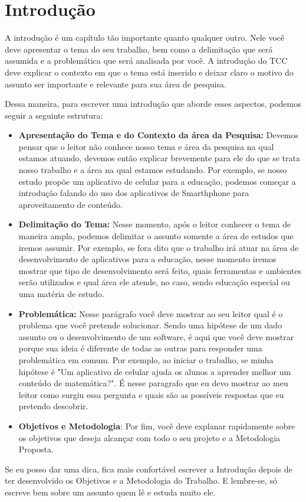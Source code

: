 \chapter{Introdução}

A introdução é um capítulo tão importante quanto qualquer outro. Nele você deve apresentar o tema do seu trabalho, bem como a delimitação que será assumida e a problemática que será analisada por você. A introdução do TCC deve explicar o contexto em que o tema está inserido e deixar claro o motivo do assunto ser importante e relevante para sua área de pesquisa.

Dessa maneira, para escrever uma introdução que aborde esses aspectos, podemos seguir a seguinte estrutura:

\begin{itemize}
    \item \textbf{Apresentação do Tema e do Contexto da área da Pesquisa:} Devemos pensar que o leitor não conhece nosso tema e área da pesquisa na qual estamos atuando, devemos então explicar brevemente para ele do que se trata nosso trabalho e a área na qual estamos estudando. Por exemplo, se nosso estudo propõe um aplicativo de celular para a educação, podemos começar a introdução falando do uso dos aplicativos de Smarthphone para aproveitamento de conteúdo.  
    
    \item \textbf{Delimitação do Tema:} Nesse momento, após o leitor conhecer o tema de maneira ampla, podemos delimitar o assunto somente a área de estudos que iremos assumir. Por exemplo, se fora dito que o trabalho irá atuar na área de desenvolvimento de aplicativos para a educação, nesse momento iremos mostrar que tipo de desenvolvimento será feito, quais ferramentas e ambientes serão utilizados e qual área ele atende, no caso, sendo educação especial ou uma matéria de estudo.
    
    \item \textbf{Problemática:} Nesse parágrafo você deve mostrar ao seu leitor qual é o problema que você pretende solucionar. Sendo uma hipótese de um dado assunto ou o desenvolvimento de um software, é aqui que você deve mostrar porque sua ideia é diferente de todas as outras para responder uma problemática em comum. Por exemplo, ao iniciar o trabalho, se minha hipótese é "Um aplicativo de celular ajuda os alunos a aprender melhor um conteúdo de matemática?". É nesse paragrafo que eu devo mostrar ao meu leitor como surgiu essa pergunta e quais são as possíveis respostas que eu pretendo descobrir.
    
    \item \textbf{Objetivos e Metodologia}: Por fim, você deve explanar rapidamente sobre os objetivos que deseja alcançar com todo o seu projeto e a Metodologia Proposta.
\end{itemize}

Se eu posso dar uma dica, fica mais confortável escrever a Introdução depois de ter desenvolvido os Objetivos e a Metodologia do Trabalho.
E lembre-se, só escreve bem sobre um assunto quem lê e estuda muito ele.


